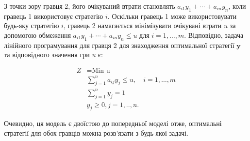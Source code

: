 \documentclass[14pt, a4paper, oneside]{extarticle}
\numberwithin{equation}{section}
\begin{document}
З точки зору гравця 2, його очікуваний втрати становлять $a_{i 1} y_{1}+\cdots+a_{i n} y_{n}$, коли гравець 1 використовує стратегію $i$. Оскільки гравець 1 може використовувати будь-яку стратегію $i$, гравець 2 намагається мінімізувати очікувані втрати $u$ за допомогою обмеження $a_{i 1} y_{1}+\cdots+a_{i n} y_{n} \leq u$ для $i=1, \ldots, m$. Відповідно, задача лінійного програмування для гравця 2 для знаходження оптимальної стратегії $\boldsymbol{y}$ та відповідного значення гри $u$ є:

\begin{equation}
\begin{aligned}
Z &= \text{Min u} \\
& \sum_{j=1}^{n} a_{i j} y_{j} \leq u, \quad i=1, \ldots, m \\
& \sum_{j=1}^{n} y_{j}=1 \\
& y_{j} \geq 0, j=1, . ., n.
\end{aligned}
\end{equation}

Очевидно, ця модель є двоїстою до попередньої моделі отже, оптимальні стратегії для обох гравців можна розв'язати з будь-якої задачі.
\end{document}
